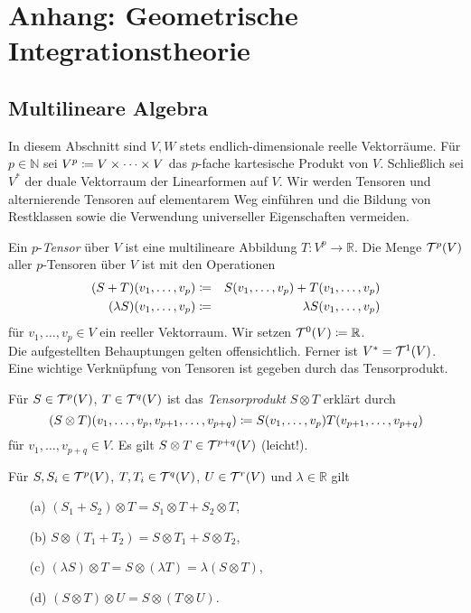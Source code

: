 \documentclass[a4paper,twoside,DIV15,BCOR12mm]{scrbook}
\begin{document}
\chapter{Anhang: Geometrische Integrationstheorie}


\section{Multilineare Algebra}

In diesem Abschnitt sind $V, W$ stets endlich-dimensionale reelle Vektorräume. Für $p 
\in {\mathbb N}$ sei $V^{p} \da  V \times \dots \times V$ das $p$-fache 
kartesische Produkt von $V$. Schließlich sei $V^{*}$ der duale 
Vektorraum der Linearformen auf $V$. Wir werden Tensoren und 
alternierende Tensoren auf elementarem Weg einführen und die Bildung 
von Restklassen sowie die Verwendung universeller Eigenschaften 
vermeiden. 

\bigskip

 Ein $p$-{\em Tensor} über $V$ ist eine 
multilineare Abbildung $T: V^{p} \to {\mathbb R}$. Die Menge ${\cal 
T}^{p}(V)$ aller $p$-Tensoren über $V$ ist mit den Operationen 
\begin{eqnarray*}
(S + T)(v_{1},\dots,v_{p}) & \da  & S(v_{1},\dots,v_{p}) + 
T(v_{1},\dots,v_{p}) \\
(\lambda S)(v_{1},\dots,v_{p}) & \da  & \lambda S(v_{1},\dots,v_{p})
\end{eqnarray*}
für $v_{1},\dots,v_{p} \in V$ 
ein reeller Vektorraum. Wir setzen ${\cal T}^{0}(V) \da  {\mathbb R}$.\\

\noindent
Die aufgestellten Behauptungen gelten offensichtlich. Ferner ist 
$V^{*} = {\cal T}^{1}(V)$.\\

\noindent
Eine wichtige Verknüpfung von Tensoren ist gegeben durch das Tensorprodukt.

\bigskip

 Für $S \in {\cal T}^{p}(V)$, $T \in 
{\cal T}^{q}(V)$ ist das {\em Tensorprodukt} $S \otimes T$ erklärt durch
\[ (S \otimes T)(v_{1},\dots,v_{p},v_{p+1},\dots,v_{p+q}) \da  
S(v_{1},\dots,v_{p})T(v_{p+1},\dots,v_{p+q}) \]
für $v_{1},\dots,v_{p+q} \in V$. Es gilt $S \otimes T \in {\cal 
T}^{p+q}(V)$ (leicht!).

\bigskip

\begin{satz}\label{Satz3.3.1} {Für $S, S_{i} \in {\cal T}^{p}(V)$, 
$T, T_{i} \in {\cal T}^{q}(V)$, $U \in {\cal T}^{r}(V)$ und $\lambda 
\in {\mathbb R}$ gilt}
\begin{enumerate}
\item[{\rm (a)}] $(S_{1} + S_{2}) \otimes T = S_{1} \otimes T + S_{2} \otimes T$,
\item[{\rm (b)}] $S \otimes (T_{1} + T_{2}) = S \otimes T_{1} + S \otimes T_{2}$,
\item[{\rm (c)}] $(\lambda S) \otimes T = S \otimes (\lambda T) = \lambda(S 
\otimes T)$,
\item[{\rm (d)}] $(S \otimes T) \otimes U = S \otimes (T \otimes U)$.
\end{enumerate}
\end{satz}
\end{document}
